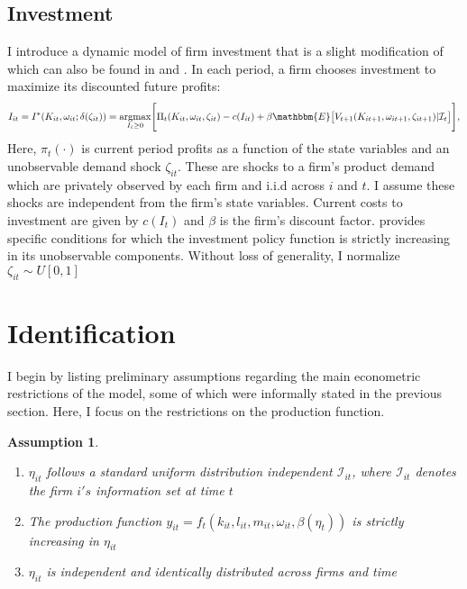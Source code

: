 \documentclass{article}
\newtheorem{assump}{Assumption}[section]
\begin{document}
\subsection*{Investment} \label{investment}
I introduce a dynamic model of firm investment that is a slight modification of \cite{Ericson1995} which can also be found in \cite{Hu2013} and \cite{Ackerberg2007}. In each period, a firm chooses investment to maximize its discounted future profits:
\begin{equation} \label{valuefn}
I_{it}=I^{*}(K_{it}, \omega_{it}; \delta(\zeta_{it}))=\underset{I_{t}\geq 0}{\operatorname{argmax}}\Bigg[\Pi_{t}(K_{it}, \omega_{it}, \zeta_{it})-c(I_{it})+\beta\mathbbm{E}\big[V_{t+1}(K_{it+1}, \omega_{it+1}, \zeta_{it+1})|\mathcal{I}_{t}\big]\Bigg],
\end{equation}
Here, $\pi_{t}(\cdot)$ is current period profits as a function of the state variables and an unobservable demand shock $\zeta_{it}$. These are shocks to a firm's product demand which are privately observed by each firm and i.i.d across $i$ and $t$. I assume these shocks are independent from the firm's state variables. Current costs to investment are given by $c(I_{t})$ and $\beta$ is the firm's discount factor. \cite{Pakesa} provides specific conditions for which the investment policy function is strictly increasing in its unobservable components. Without loss of generality, I normalize $\zeta_{it}\sim U[0,1]$


\section{Identification}

I begin by listing preliminary assumptions regarding the main econometric restrictions of the model, some of which were informally stated in the previous section. Here, I focus on the restrictions on the production function.

\begin{assump} \label{pfmomentassume}
~
\begin{enumerate}[label=(\roman*)]
    \item $\eta_{it}$ follows a standard uniform distribution independent $\mathcal{I}_{it}$, where $\mathcal{I}_{it}$ denotes the firm $i's$ information set at time $t$
    \item The production function $y_{it}=f_{t}(k_{it}, l_{it}, m_{it}, \omega_{it}, \beta(\eta_{t}))$ is strictly increasing in $\eta_{it}$
    \item $\eta_{it}$ is independent and identically distributed across firms and time
    \end{enumerate}
\end{assump}
\end{document}
